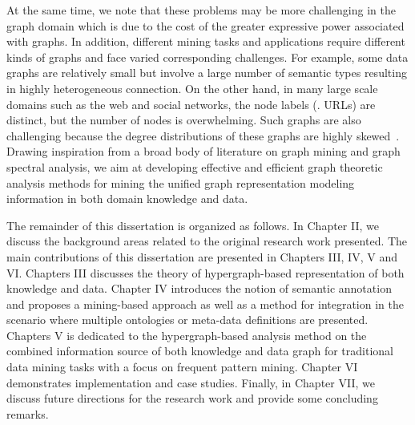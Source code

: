 \begin{enumerate}
    At the same time, we note that these problems may be more challenging in the graph domain which is due to the cost of the greater expressive power associated with graphs. In addition, different mining tasks and applications require different kinds of graphs and face varied corresponding challenges. For example, some data graphs are relatively small but involve a large number of semantic types resulting in highly heterogeneous connection. On the other hand, in many large scale domains such as the web and social networks, the node labels (\eg. URLs) are distinct, but the number of nodes is overwhelming. Such graphs are also challenging because the degree distributions of these graphs are highly skewed~\cite{Faloutsos1999}. Drawing inspiration from a broad body of literature on graph mining and graph spectral analysis, we aim at developing effective and efficient graph theoretic analysis methods for mining the unified graph representation modeling information in both domain knowledge and data.

\end{enumerate}

The remainder of this dissertation is organized as follows. In Chapter II, we discuss the background areas related to the original research work presented. The main contributions of this dissertation are presented in Chapters III, IV, V and VI. Chapters III discusses the theory of hypergraph-based representation of both knowledge and data. Chapter IV introduces the notion of semantic annotation and proposes a mining-based approach as well as a method for integration in the scenario where multiple ontologies or meta-data definitions are presented. Chapters V is dedicated to the hypergraph-based analysis method on the combined information source of both knowledge and data graph for traditional data mining tasks with a focus on frequent pattern mining. Chapter VI demonstrates implementation and case studies. Finally, in Chapter VII, we discuss future directions for the research work and provide some concluding remarks.







